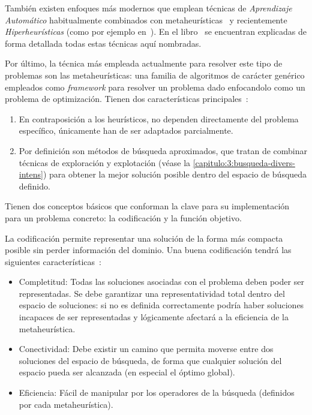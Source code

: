 También existen enfoques más modernos que emplean técnicas de \textit{Aprendizaje Automático} habitualmente combinados con metaheurísticas~\cite{sota:machine-learning-geneticos} y recientemente \textit{Hiperheurísticas} (como por ejemplo en~\cite{sota:hiperheuristicas}). En el libro~\cite{sota:libro-sota-scheduling} se encuentran explicadas de forma detallada todas estas técnicas aquí nombradas.

Por último, la técnica más empleada actualmente para resolver este tipo de problemas son las metaheurísticas: una familia de algoritmos de carácter genérico empleados como \textit{framework} para resolver un problema dado enfocandolo como un problema de optimización. Tienen dos características principales~\cite{sota:metaheuristicas}:

\begin{enumerate}
    \item En contraposición a los heurísticos, no dependen directamente del problema específico, únicamente han de ser adaptados parcialmente.
    \item Por definición son métodos de búsqueda aproximados, que tratan de combinar técnicas de exploración y explotación (véase la \autoref{capitulo:3:busqueda-divers-intens}) para obtener la mejor solución posible dentro del espacio de búsqueda definido.
\end{enumerate}

Tienen dos conceptos básicos que conforman la clave para su implementación para un problema concreto: la codificación y la función objetivo.

La codificación permite representar una solución de la forma más compacta posible sin perder información del dominio. Una buena codificación tendrá las siguientes características~\cite{sota:metaheuristicas-design-impl}:

\begin{itemize}
    \item Completitud: Todas las soluciones asociadas con el problema deben poder ser representadas. Se debe garantizar una representatividad total dentro del espacio de soluciones: si no es definida correctamente podría haber soluciones incapaces de ser representadas y lógicamente afectará a la eficiencia de la metaheurística.
    \item Conectividad: Debe existir un camino que permita moverse entre dos soluciones del espacio de búsqueda, de forma que cualquier solución del espacio pueda ser alcanzada (en especial el óptimo global).
    \item Eficiencia: Fácil de manipular por los operadores de la búsqueda (definidos por cada metaheurística).
\end{itemize}

